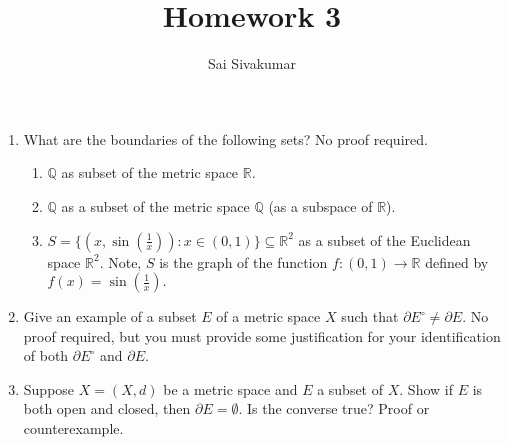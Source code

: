 \documentclass[12pt]{amsart}
\title{Homework 3}
\author{Sai Sivakumar}
\newcommand{\RR}{\mathbb{R}}
\newcommand{\QQ}{\mathbb{Q}}
\begin{document}
\maketitle

\begin{enumerate}\itemsep=10pt
 \item What are the boundaries of the following sets? No proof required.
  \begin{enumerate}\itemsep=7pt
   \item $\QQ$ as subset of the metric space $\RR.$
   \item $\QQ$ as a subset of the metric space $\QQ$ (as a subspace of $\RR$).
   \item $S=\{(x,\sin(\frac1x)): x\in (0,1)\}\subseteq \RR^2$ as a subset of
     the Euclidean space $\RR^2.$ Note, $S$ is the graph of the function
   $f:(0,1)\to\RR$ defined by $f(x)=\sin(\frac1x).$
 \end{enumerate}


\item Give an example of a subset $E$ of a metric space $X$ such that
 $\partial E^\circ \ne \partial E.$ No proof required, but you must
 provide some justification for your identification of both $\partial E^\circ$
 and $\partial E.$

\item Suppose $X=(X,d)$ be a metric space and $E$ a subset of $X.$ Show
 if $E$ is both open and closed, then $\partial E=\emptyset.$ Is
 the converse true? Proof or counterexample.
\end{enumerate}
\vspace*{2em}
\end{document}
